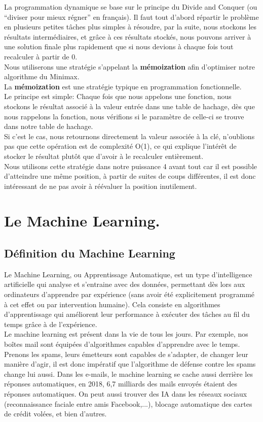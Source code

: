 \documentclass[a4paper, 12pt]{article}
\numberwithin{equation}{subsection}
\begin{document}
La programmation dynamique se base sur le principe du Divide and Conquer (ou ``diviser pour mieux régner'' en français). Il faut tout d'abord répartir le problème en plusieurs petites tâches plus simples à résoudre, par la suite, nous stockons les résultats intermédiaires, et grâce à ces résultats stockés, nous pouvons arriver à une solution finale plus rapidement que si nous devions à chaque fois tout recalculer à partir de 0.\\

Nous utiliserons une stratégie s'appelant la {\bf mémoization} afin d'optimiser notre algorithme du Minimax.\\
La {\bf mémoization} est une stratégie typique en programmation fonctionnelle.\\

Le principe est simple: Chaque fois que nous appelons une fonction, nous stockons le résultat associé à la valeur entrée dans une table de hachage, dès que nous rappelons la fonction, nous vérifions si le paramètre de celle-ci se trouve dans notre table de hachage.\\
Si c'est le cas, nous retournons directement la valeur associée à la clé, n'oublions pas que cette opération est de complexité O(1), ce qui explique l'intérêt de stocker le résultat plutôt que d'avoir à le recalculer entièrement.\\

Nous utilisons cette stratégie dans notre puissance 4 avant tout car il est possible d'atteindre une même position, à partir de suites de coups différentes, il est donc intéressant de ne pas avoir à réévaluer la position inutilement.
\newpage
\section{Le Machine Learning.}
\subsection{Définition du Machine Learning}
Le Machine Learning, ou Apprentissage Automatique, est un type d'intelligence artificielle qui analyse et s'entraine avec des données, permettant dès lors aux ordinateurs d'apprendre par expérience (sans avoir été explicitement programmé à cet effet ou par intervention humaine). Cela consiste en algorithmes d’apprentissage qui améliorent leur performance à exécuter des tâches au fil du temps grâce à de l’expérience.\\

Le machine learning est présent dans la vie de tous les jours. Par exemple, nos boîtes mail sont équipées d'algorithmes capables d’apprendre avec le temps. Prenons les spams, leurs émetteurs sont capables de s'adapter, de changer leur manière d’agir, il est donc impératif que l’algorithme de défense contre les spams change lui aussi. Dans les e-mails, le machine learning se cache aussi derrière les réponses automatiques, en 2018, 6,7 milliards des mails envoyés étaient des réponses automatiques. On peut aussi trouver des IA dans les réseaux sociaux (reconnaissance faciale entre amis Facebook,...), blocage automatique des cartes de crédit volées, et bien d'autres.\\[1.0cm]
\end{document}
